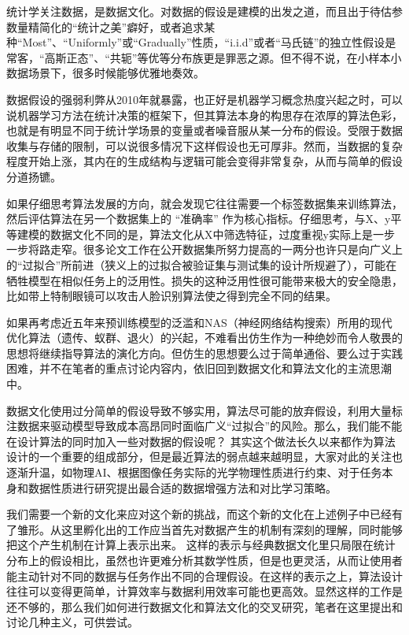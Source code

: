 \documentclass{ctexart}
\begin{document}
统计学关注数据，是数据文化。对数据的假设是建模的出发之道，而且出于待估参数量精简化的“统计之美”癖好，或者追求某种“Most”、“Uniformly”或“Gradually”性质，“i.i.d”或者“马氏链”的独立性假设是常客，“高斯正态”、“共轭”等优等分布族更是罪恶之源。但不得不说，在小样本小数据场景下，很多时候能够优雅地奏效。

数据假设的强弱利弊从2010年就暴露，也正好是机器学习概念热度兴起之时，可以说机器学习方法在统计决策的框架下，但其算法本身的构思存在浓厚的算法色彩，也就是有明显不同于统计学场景的变量或者噪音服从某一分布的假设。受限于数据收集与存储的限制，可以说很多情况下这样假设也无可厚非。然而，当数据的复杂程度开始上涨，其内在的生成结构与逻辑可能会变得非常复杂，从而与简单的假设分道扬镳。

如果仔细思考算法发展的方向，就会发现它往往需要一个标签数据集来训练算法，然后评估算法在另一个数据集上的 “准确率” 作为核心指标。仔细思考，与X、y平等建模的数据文化不同的是，算法文化从X中筛选特征，过度重视y实际上是一步一步将路走窄。很多论文工作在公开数据集所努力提高的一两分也许只是向广义上的“过拟合”所前进（狭义上的过拟合被验证集与测试集的设计所规避了），可能在牺牲模型在相似任务上的泛用性。损失的这种泛用性很可能带来极大的安全隐患，比如带上特制眼镜可以攻击人脸识别算法使之得到完全不同的结果。

如果再考虑近五年来预训练模型的泛滥和NAS（神经网络结构搜索）所用的现代优化算法（遗传、蚁群、退火）的兴起，不难看出仿生作为一种绝妙而令人敬畏的思想将继续指导算法的演化方向。但仿生的思想要么过于简单通俗、要么过于实践困难，并不在笔者的重点讨论内容内，依旧回到数据文化和算法文化的主流思潮中。

数据文化使用过分简单的假设导致不够实用，算法尽可能的放弃假设，利用大量标注数据来驱动模型导致成本高昂同时面临广义“过拟合”的风险。那么，我们能不能在设计算法的同时加入一些对数据的假设呢？ 其实这个做法长久以来都作为算法设计的一个重要的组成部分，但是最近算法的弱点越来越明显，大家对此的关注也逐渐升温，如物理AI、根据图像任务实际的光学物理性质进行约束、对于任务本身和数据性质进行研究提出最合适的数据增强方法和对比学习策略。

我们需要一个新的文化来应对这个新的挑战，而这个新的文化在上述例子中已经有了雏形。从这里孵化出的工作应当首先对数据产生的机制有深刻的理解，同时能够把这个产生机制在计算上表示出来。 这样的表示与经典数据文化里只局限在统计分布上的假设相比，虽然也许更难分析其数学性质，但是也更灵活，从而让使用者能主动针对不同的数据与任务作出不同的合理假设。在这样的表示之上，算法设计往往可以变得更简单，计算效率与数据利用效率可能也更高效。显然这样的工作是还不够的，那么我们如何进行数据文化和算法文化的交叉研究，笔者在这里提出和讨论几种主义，可供尝试。
\end{document}
